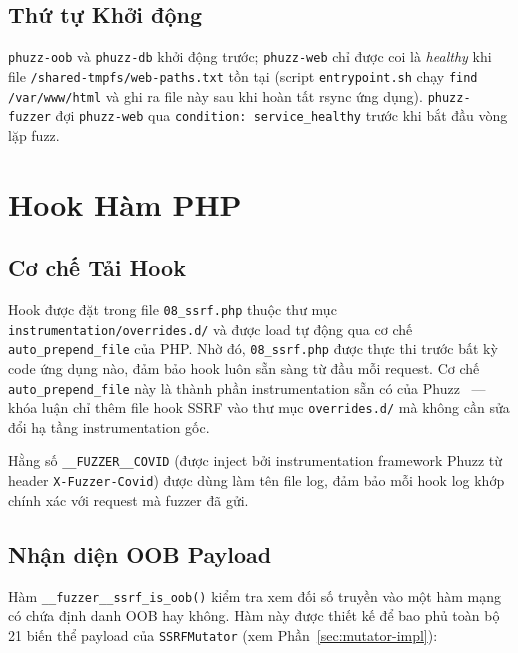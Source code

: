 \subsection{Thứ tự Khởi động}

\texttt{phuzz-oob} và \texttt{phuzz-db} khởi động trước; \texttt{phuzz-web}
chỉ được coi là \textit{healthy} khi file \texttt{/shared-tmpfs/web-paths.txt}
tồn tại (script \texttt{entrypoint.sh} chạy \texttt{find /var/www/html} và
ghi ra file này sau khi hoàn tất rsync ứng dụng). \texttt{phuzz-fuzzer} đợi
\texttt{phuzz-web} qua \texttt{condition: service\_healthy} trước khi bắt đầu
vòng lặp fuzz.

\section{Hook Hàm PHP}
\label{sec:hook-impl}

\subsection{Cơ chế Tải Hook}

Hook được đặt trong file \texttt{08\_ssrf.php} thuộc thư mục
\texttt{instrumentation/overrides.d/} và được load tự động qua cơ chế
\texttt{auto\_prepend\_file} của PHP. Nhờ đó, \texttt{08\_ssrf.php} được
thực thi trước bất kỳ code ứng dụng nào, đảm bảo hook luôn sẵn sàng từ
đầu mỗi request. Cơ chế \texttt{auto\_prepend\_file} này là thành phần
instrumentation sẵn có của Phuzz~\cite{neef2024phuzz} --- khóa luận chỉ
thêm file hook SSRF vào thư mục \texttt{overrides.d/} mà không cần sửa
đổi hạ tầng instrumentation gốc.

Hằng số \texttt{\_\_FUZZER\_\_COVID} (được inject bởi instrumentation
framework Phuzz từ header \texttt{X-Fuzzer-Covid}) được dùng làm tên file
log, đảm bảo mỗi hook log khớp chính xác với request mà fuzzer đã gửi.

\subsection{Nhận diện OOB Payload}

Hàm \texttt{\_\_fuzzer\_\_ssrf\_is\_oob()} kiểm tra xem đối số truyền vào
một hàm mạng có chứa định danh OOB hay không. Hàm này được thiết kế để bao
phủ toàn bộ 21 biến thể payload của \texttt{SSRFMutator} (xem
Phần~\ref{sec:mutator-impl}):

